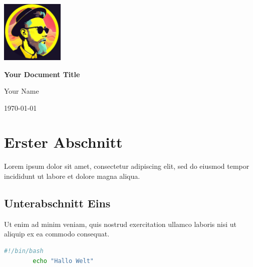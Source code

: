 \documentclass[a4paper]{article}
\begin{document}
	
		\begin{titlepage}
			\begin{center}
				\includegraphics[width=3cm]{figures/logo} %
				\vspace{1cm}
				
				\Huge \textbf{Your Document Title}
				
				\vspace{2cm}
				
				\Large Your Name
				
				\vfill
				
				\today
			\end{center}
		\end{titlepage}

	\tableofcontents
	\newpage
	
	\section{Erster Abschnitt}
	Lorem ipsum dolor sit amet, consectetur adipiscing elit, sed do eiusmod tempor incididunt ut labore et dolore magna aliqua.
	
	\subsection{Unterabschnitt Eins}
	Ut enim ad minim veniam, quis nostrud exercitation ullamco laboris nisi ut aliquip ex ea commodo consequat.
	
	\begin{lstlisting}[language=bash, caption={Beispiel Bash-Skript}]
		#!/bin/bash
		echo "Hallo Welt"
	\end{lstlisting}
	
\end{document}

